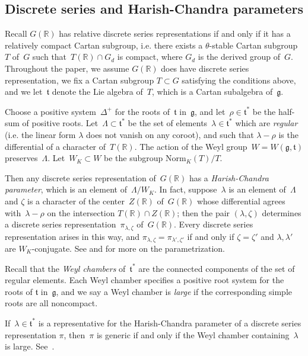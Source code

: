 \documentclass[10pt,leqno]{article}
\numberwithin{equation}{section}
\newcommand{\R}{\mathbb R}
\renewcommand{\t}{\mathfrak t}
\newcommand{\g}{\mathfrak g}
\begin{document}
\subsection{Discrete series and Harish-Chandra parameters} \label{sec:discrete_series}

Recall $G(\R)$ has relative discrete series representations if and only if it has a relatively compact Cartan subgroup, i.e. there exists a $\theta$-stable Cartan subgroup~$T$ of~$G$  such that~$T(\R) \cap G_d$ is  compact, where $G_d$ is the derived group of~$G$. Throughout the paper, we assume $G(\R)$ does have discrete series representation, we fix  a Cartan subgroup $T \subset G$ satisfying the conditions above, and we let~$\mathfrak{t}$ denote the Lie algebra of~$T$, which is a Cartan subalgebra of~$\g$. 

Choose a  positive system~$\Delta^+$  for the roots of~$\t$ in~$\g$, and let~$\rho \in \mathfrak{t}^\ast$ be the half-sum of positive roots. Let~$\Lambda \subset \mathfrak{t}^\ast$ be the set of elements~$\lambda \in \mathfrak{t}^\ast$ which are \emph{regular} (i.e. the linear form $\lambda$ does not vanish on any coroot), and such that $\lambda-\rho$  is the differential of a character of~$T(\R)$. The action of the Weyl group~$W=W(\g, \t)$ preserves~$\Lambda$. Let~$W_K\subset W$ be the subgroup $\mathrm{Norm}_K(T)/T$. 


Then any discrete series representation of~$G(\R)$ has a \emph{Harish-Chandra parameter}, which is an element of~$\Lambda/W_K$. In fact, suppose~$\lambda$ is an element of~$\Lambda$ and $\zeta$ is a character of the center~$Z(\R)$ of~$G(\R)$ whose differential agrees with~$\lambda-\rho$ on the intersection $T(\R) \cap Z(\R)$; then the pair $(\lambda, \zeta)$  determines a discrete series representation~$\pi_{\lambda, \zeta}$ of~$G(\R)$. Every discrete series representation arises in this way, and $\pi_{\lambda, \zeta}=\pi_{\lambda', \zeta'}$ if and only if $\zeta=\zeta'$ and $\lambda, \lambda'$ are $W_K$-conjugate. See  \cite[Section 8]{AV1} and \cite{Contragredient} for more on the parametrization.  

Recall that the \emph{Weyl chambers} of~$\mathfrak{t}^\ast$ are the connected components of the set of regular elements. Each Weyl chamber specifies a positive root system for the roots of $\mathfrak{t}$ in~$\g$, and we say a Weyl chamber is \emph{large} if the corresponding simple roots are all noncompact. 

If~$\lambda \in \mathfrak{t}^\ast$ is a representative for the Harish-Chandra parameter of a discrete series representation $\pi$, then~$\pi$ is generic if and only if the Weyl chamber containing~$\lambda$ is large. See~\cite[Section 6]{vogan-gelfand-kirillov}.
\end{document}
